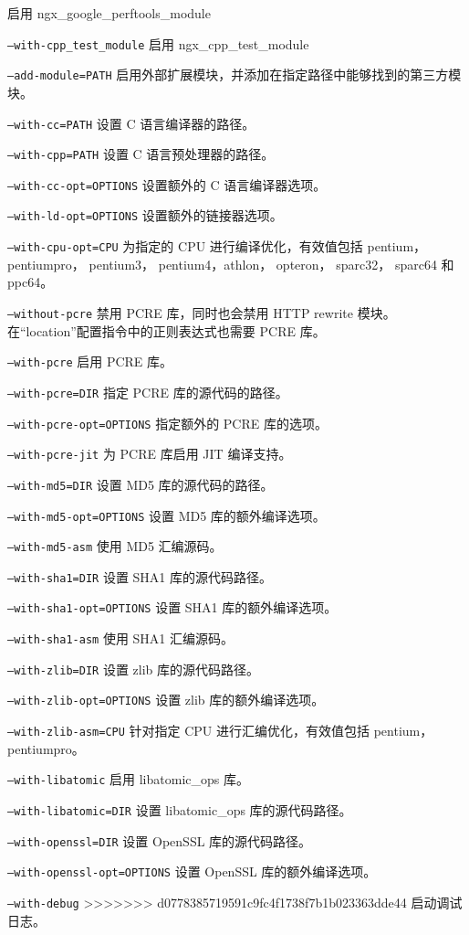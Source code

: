 \begin{compactitem}
启用 ngx\_google\_perftools\_module
\item \texttt{--with-cpp\_test\_module}
启用 ngx\_cpp\_test\_module
\item \texttt{--add-module=PATH}
启用外部扩展模块，并添加在指定路径中能够找到的第三方模块。
\item \texttt{--with-cc=PATH}
设置 C 语言编译器的路径。
\item \texttt{--with-cpp=PATH}
设置 C 语言预处理器的路径。
\item \texttt{--with-cc-opt=OPTIONS}
设置额外的 C 语言编译器选项。
\item \texttt{--with-ld-opt=OPTIONS}
设置额外的链接器选项。
\item \texttt{--with-cpu-opt=CPU}
为指定的 CPU 进行编译优化，有效值包括 pentium， pentiumpro， pentium3， pentium4，athlon， opteron， sparc32， sparc64 和 ppc64。
\item \texttt{--without-pcre}
禁用 PCRE 库，同时也会禁用 HTTP rewrite 模块。在“location”配置指令中的正则表达式也需要 PCRE 库。
\item \texttt{--with-pcre}
启用 PCRE 库。
\item \texttt{--with-pcre=DIR}
指定 PCRE 库的源代码的路径。
\item \texttt{--with-pcre-opt=OPTIONS}
指定额外的 PCRE 库的选项。
\item \texttt{--with-pcre-jit}
为 PCRE 库启用 JIT 编译支持。
\item \texttt{--with-md5=DIR}
设置 MD5 库的源代码的路径。
\item \texttt{--with-md5-opt=OPTIONS}
设置 MD5 库的额外编译选项。
\item \texttt{--with-md5-asm}
使用 MD5 汇编源码。
\item \texttt{--with-sha1=DIR}
设置 SHA1 库的源代码路径。
\item \texttt{--with-sha1-opt=OPTIONS}
设置 SHA1 库的额外编译选项。
\item \texttt{--with-sha1-asm}
使用 SHA1 汇编源码。
\item \texttt{--with-zlib=DIR}
设置 zlib 库的源代码路径。
\item \texttt{--with-zlib-opt=OPTIONS}
设置 zlib 库的额外编译选项。
\item \texttt{--with-zlib-asm=CPU}
针对指定 CPU 进行汇编优化，有效值包括 pentium， pentiumpro。
\item \texttt{--with-libatomic}
启用 libatomic\_ops 库。
\item \texttt{--with-libatomic=DIR}
设置 libatomic\_ops 库的源代码路径。
\item \texttt{--with-openssl=DIR}
设置 OpenSSL 库的源代码路径。
\item \texttt{--with-openssl-opt=OPTIONS}
设置 OpenSSL 库的额外编译选项。
\item \texttt{--with-debug}
>>>>>>> d0778385719591c9fc4f1738f7b1b023363dde44
启动调试日志。
\end{compactitem}


